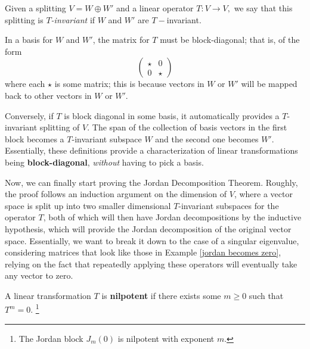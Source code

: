 
\begin{definition}
Given a splitting $V = W \oplus W'$ and a linear operator $T: V \rightarrow V,$ we say that this splitting is \emph{$T$-invariant} if $W$ and $W'$ are $T-$invariant. 
\end{definition}

In a basis for $W$ and $W'$, the matrix for $T$ must be block-diagonal; that is, of the form
\[
\begin{pmatrix}
\star & 0 \\
0 & \star
\end{pmatrix}
\]
where each $\star$ is some matrix; this is because vectors in $W$ or $W'$ will be mapped back to other vectors in $W$ or $W'.$ 

Conversely, if $T$ is block diagonal in some basis, it automatically provides a $T$-invariant splitting of $V.$ The span of the collection of basis vectors in the first block becomes a $T$-invariant subspace $W$ and the second one becomes $W'.$ Essentially, these definitions provide a characterization of linear transformations being \textbf{block-diagonal}, \emph{without} having to pick a basis. 


Now, we can finally start proving the Jordan Decomposition Theorem. Roughly, the proof follows an induction argument on the dimension of $V$, where a vector space is split up into two smaller dimensional $T$-invariant subspaces for the operator $T$, both of which will then have Jordan decompositions by the inductive hypothesis, which will provide the Jordan decomposition of the original vector space. Essentially, we want to break it down to the case of a singular eigenvalue, considering matrices that look like those in Example \ref{jordan becomes zero}, relying on the fact that repeatedly applying these operators will eventually take any vector to zero. 


\begin{definition}
A linear transformation $T$ is \textbf{nilpotent} if there exists some $m \geq 0$ such that $T^m = 0$. \footnote{The Jordan block $J_m(0)$ is nilpotent with exponent $m.$} %
\end{definition}

